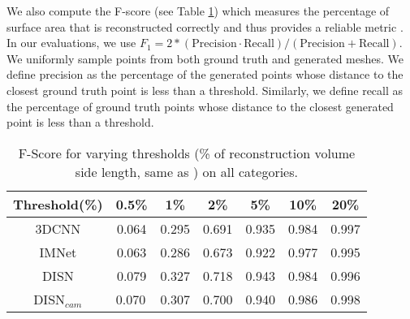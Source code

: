 We also compute the F-score (see Table \ref{tab:fscore}) which measures the percentage of surface area that is reconstructed correctly and thus provides a reliable metric \cite{tatarchenko2019single}. In our evaluations, we use $F_1 = 2 * (\text{Precision} \cdot \text{Recall})/ (\text{Precision} + \text{Recall})$. We uniformly sample points from both ground truth and generated meshes. We define precision as the percentage of the generated points whose distance to the closest ground truth point is less than a threshold. Similarly, we define recall as the percentage of ground truth points whose distance to the closest generated point is less than a threshold.

\begin{table}[]
\begin{minipage}{.6\textwidth}
    \centering
    \setlength{\tabcolsep}{3pt} \setlength{\arrayrulewidth}{1pt}
    \begin{tabular}{c|cccccc}
        \hline
        Threshold(\%) & 0.5\%                     & 1\%                       & 2\%                       & 5\%                       & 10\%                      & 20\%                      \\ \hline
        3DCNN                & 0.064                     & 0.295                     & 0.691                     & 0.935                     & 0.984                     & 0.997                     \\ \hline
        IMNet                & 0.063                     & 0.286                     & 0.673                     & 0.922                     & 0.977                     & 0.995                     \\ \hline
        DISN          & 0.079                     & 0.327                     & 0.718                     & 0.943                     & 0.984                     & 0.996                     \\ \hline
        DISN$_{cam}$         & \multicolumn{1}{l}{0.070} & \multicolumn{1}{l}{0.307} & \multicolumn{1}{l}{0.700} & \multicolumn{1}{l}{0.940} & \multicolumn{1}{l}{0.986} & \multicolumn{1}{l}{0.998} \\ \hline
        \bottomrule
    \end{tabular}
    \vspace{3pt}
    \caption {F-Score for varying thresholds (\% of reconstruction volume side length, same as \cite{tatarchenko2019single}) on all categories.}
    \label{tab:fscore}
\end{minipage}
\vspace{-10pt}

\end{table}
